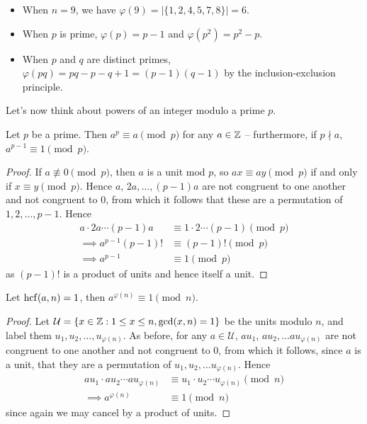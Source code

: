 \documentclass{../../template/note}
\begin{document}
    \begin{example}
        \begin{itemize}
            \item When \(n = 9\), we have \(\varphi(9) = |\{1, 2, 4, 5, 7, 8\}| = 6\).
            \item When \(p\) is prime, \(\varphi(p) = p-1\) and \(\varphi(p^2) = p^2 - p\).
            \item When \(p\) and \(q\) are distinct primes, \(\varphi(pq) = pq - p - q + 1 = (p-1)(q-1)\) by the inclusion-exclusion principle.
        \end{itemize}
    \end{example}

    Let's now think about powers of an integer modulo a prime \(p\).
    
    \begin{theorem}
        Let \(p\) be a prime. Then \(a^p \equiv a \pmod p\) for any \(a \in \mathbb Z\) -- furthermore, if \(p \nmid a\), \(a^{p-1} \equiv 1 \pmod p\).
    \end{theorem}
    
    \begin{proof}
        If \(a \not\equiv 0 \pmod p\), then \(a\) is a unit mod \(p\), so \(ax \equiv ay \pmod p\) if and only if \(x \equiv y \pmod p\). Hence \(a\), \(2a, \dots, (p-1)a\) are not congruent to one another and not congruent to 0, from which it follows that these are a permutation of \(1, 2, \dots, p-1\). Hence
        \begin{align*}
            a \cdot 2a \cdots (p-1)a &\equiv 1 \cdot 2 \cdots (p-1) \pmod p \\
            \implies a^{p-1}(p-1)! &\equiv (p-1)! \pmod p \\
            \implies a^{p-1} &\equiv 1 \pmod p
        \end{align*}
        as \((p-1)!\) is a product of units and hence itself a unit.
    \end{proof}
    
    \begin{theorem}
        Let \(\operatorname{hcf}(a, n) = 1\), then \(a^{\varphi(n)} \equiv 1 \pmod n\).
        \label{fermat-euler}
    \end{theorem}
    
    \begin{proof}
        Let \(\mathcal U = \{x \in \mathbb Z: 1 \leq x \leq n, \gcd(x, n) = 1\}\) be the units modulo \(n\), and label them \(u_1, u_2, \dots, u_{\varphi(n)}\). As before, for any \(a \in \mathcal U\), \(au_1\), \(au_2, \dots au_{\varphi(n)}\) are not congruent to one another and not congruent to 0, from which it follows, since \(a\) is a unit, that they are a permutation of \(u_1, u_2, \dots u_{\varphi(n)}\). Hence
        \begin{align*}
            au_1 \cdot au_2 \cdots au_{\varphi(n)} &\equiv u_1 \cdot u_2 \cdots u_{\varphi(n)} \pmod n \\
            \implies a^{\varphi(n)} &\equiv 1 \pmod n
        \end{align*}
        since again we may cancel by a product of units.
    \end{proof}
    
\end{document}
